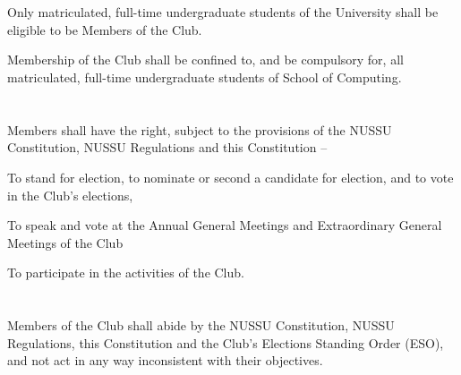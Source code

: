 
\section{}
Only matriculated, full-time undergraduate students of the University shall be eligible to be Members of the Club.
	\begin{legal}
		\item Membership of the Club shall be confined to, and be compulsory for, all matriculated, full-time undergraduate students of School of Computing.
	\end{legal}

\section{}
Members shall have the right, subject to the provisions of the NUSSU Constitution, NUSSU Regulations and this Constitution –
	\begin{legal}
		\item To stand for election, to nominate or second a candidate for election, and to vote in the Club’s elections,
		\item To speak and vote at the Annual General Meetings and Extraordinary General Meetings of the Club
		\item To participate in the activities of the Club.
	\end{legal}

\section{}
Members of the Club shall abide by the NUSSU Constitution, NUSSU Regulations, this Constitution and the Club’s Elections Standing Order (ESO), and not act in any way inconsistent with their objectives.